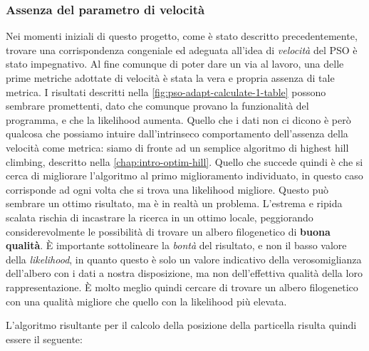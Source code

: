 \subsubsection{Assenza del parametro di velocità}
\label{chap:pso-adapt-calculate-1}
Nei momenti iniziali di questo progetto, come è stato descritto precedentemente, trovare una corrispondenza congeniale ed adeguata all'idea di \textit{velocità} del PSO è stato impegnativo. Al fine comunque di poter dare un via al lavoro, una delle prime metriche adottate di velocità è stata la vera e propria assenza di tale metrica. I risultati descritti nella \autoref{fig:pso-adapt-calculate-1-table} possono sembrare promettenti, dato che comunque provano la funzionalità del programma, e che la likelihood aumenta. Quello che i dati non ci dicono è però qualcosa che possiamo intuire dall'intrinseco comportamento dell'assenza della velocità come metrica: siamo di fronte ad un semplice algoritmo di highest hill climbing, descritto nella \autoref{chap:intro-optim-hill}. Quello che succede quindi è che si cerca di migliorare l'algoritmo al primo miglioramento individuato, in questo caso corrisponde ad ogni volta che si trova una likelihood migliore. Questo può sembrare un ottimo risultato, ma è in realtà un problema. L'estrema e ripida scalata rischia di incastrare la ricerca in un ottimo locale, peggiorando considerevolmente le possibilità di trovare un albero filogenetico di \textbf{buona qualità}. È importante sottolineare la \textit{bontà} del risultato, e non il basso valore della \textit{likelihood}, in quanto questo è solo un valore indicativo della verosomiglianza dell'albero con i dati a nostra disposizione, ma non dell'effettiva qualità della loro rappresentazione. È molto meglio quindi cercare di trovare un albero filogenetico con una qualità migliore che quello con la likelihood più elevata.

L'algoritmo risultante per il calcolo della posizione della particella risulta quindi essere il seguente:


